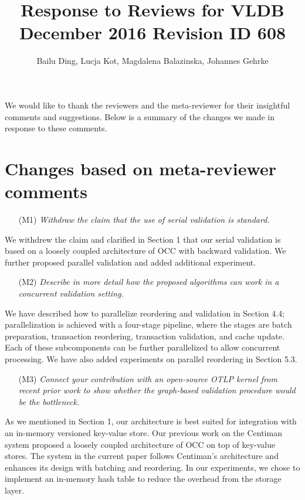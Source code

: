 \documentclass{article}
\begin{document}
\title{Response to Reviews for VLDB December 2016 Revision ID 608}
\author{Bailu Ding, Lucja Kot, Magdalena Balazinska, Johannes Gehrke}
\maketitle

We would like to thank the reviewers and the meta-reviewer for their insightful comments and suggestions. Below is a summary of the changes we made in response to these comments.

\section{Changes based on meta-reviewer comments}

\begin{itemize}
\item[(M1)] \emph{Withdraw the claim that the use of serial validation is standard. }
\end{itemize}
\vspace{-1em}
We withdrew the claim and clarified in Section 1 that our serial validation is based on a loosely coupled architecture of OCC with backward validation. We further proposed parallel validation and added additional experiment.
\begin{itemize}
\item[(M2)] \emph{Describe in more detail how the proposed algorithms can work in a concurrent validation setting. }
\end{itemize}
\vspace{-1em}
We have described how to parallelize reordering and validation in Section 4.4; parallelization is achieved with a four-stage pipeline, where the stages are batch preparation, transaction reordering, transaction validation, and cache update. Each of these subcomponents can be further parallelized to allow concurrent processing. We have also added experiments on parallel reordering in Section 5.3. 

\begin{itemize}
\item[(M3)]  \emph{Connect your contribution with an open-source OTLP kernel from recent prior work to show whether the graph-based validation procedure would be the bottleneck.}
\end{itemize}
\vspace{-1em}
As we mentioned in Section 1, our architecture is best suited for integration with an in-memory versioned key-value store. Our previous work on the Centiman system proposed a loosely coupled architecture of OCC on top of key-value stores. The system in the current paper follows Centiman’s architecture and enhances its design with batching and reordering. In our experiments, we chose to implement an in-memory hash table to reduce the overhead from the storage layer.
\end{document}
